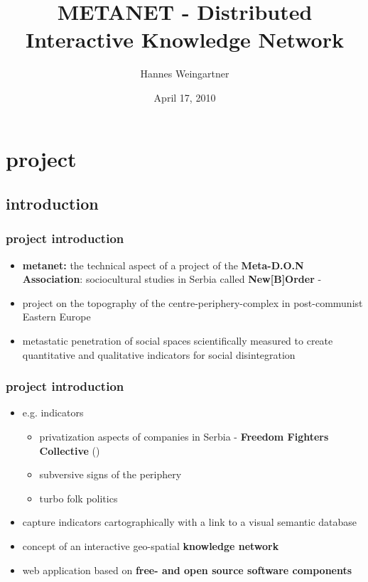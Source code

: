 \documentclass[blue]{beamer}
\title{METANET - Distributed Interactive Knowledge Network}
\institute[META-D.O.N]{META-D.O.N\\Association for Cultural Substitution Services}
\author{Hannes Weingartner}
\date{April 17, 2010}
\begin{document}
\frame{\titlepage}

\setcounter{tocdepth}{1}
\frame{\tableofcontents}




\section{project}
\subsection{introduction}
\frame
{
\frametitle{\textbf{project introduction}}
\begin{itemize}
\item \textbf{metanet:} the technical aspect of a project of the \textbf{Meta-D.O.N Association}: sociocultural studies in Serbia called \textbf{New[B]Order} - 
\item project on the topography of the centre-periphery-complex in post-communist Eastern Europe
\item metastatic penetration of social spaces scientifically measured to create quantitative and qualitative indicators for social disintegration
\end{itemize}
}

\frame
{
\frametitle{\textbf{project introduction}}
\begin{itemize}
	\item e.g. indicators
	\begin{itemize}
		\item privatization aspects of companies in Serbia - \textbf{Freedom Fighters Collective} ()
		\item subversive signs of the periphery
		\item turbo folk politics
	\end{itemize}
	\item capture indicators cartographically with a link to a visual semantic database
	\item concept of an interactive geo-spatial \textbf{knowledge network}
	\item web application based on \textbf{free- and open source software components}
\end{itemize}
}
\end{document}

